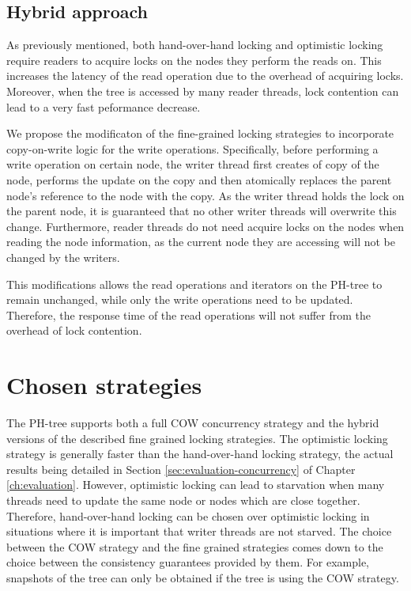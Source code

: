 \documentclass[11pt,a4paper]{globis-book}
\begin{document}
\subsection{Hybrid approach}
As previously mentioned, both hand-over-hand locking and optimistic locking require readers to acquire locks on the nodes they perform the reads on. This increases the latency of the read operation due to the overhead of acquiring locks. Moreover, when the tree is accessed by many reader threads, lock contention can lead to a very fast peformance decrease. 

We propose the modificaton of the fine-grained locking strategies to incorporate copy-on-write logic for the write operations. Specifically, before performing a write operation on certain node, the writer thread first creates of copy of the node, performs the update on the copy and then atomically replaces the parent node's reference to the node with the copy. As the writer thread holds the lock on the parent node, it is guaranteed that no other writer threads will overwrite this change. Furthermore, reader threads do not need acquire locks on the nodes when reading the node information, as the current node they are accessing will not be changed by the writers. 

This modifications allows the read operations and iterators on the PH-tree to remain unchanged, while only the write operations need to be updated. Therefore, the response time of the read operations will not suffer from the overhead of lock contention. 

\section{Chosen strategies}
The PH-tree supports both a full COW concurrency strategy and the hybrid versions of the described fine grained locking strategies. The optimistic locking strategy is generally faster than the hand-over-hand locking strategy, the actual results being detailed in Section \ref{sec:evaluation-concurrency} of Chapter \ref{ch:evaluation}. However, optimistic locking can lead to starvation when many threads need to update the same node or nodes which are close together. Therefore, hand-over-hand locking can be chosen over optimistic locking in situations where it is important that writer threads are not starved. The choice between the COW strategy and the fine grained strategies comes down to the choice between the consistency guarantees provided by them. For example, snapshots of the tree can only be obtained if the tree is using the COW strategy. 
\end{document}
